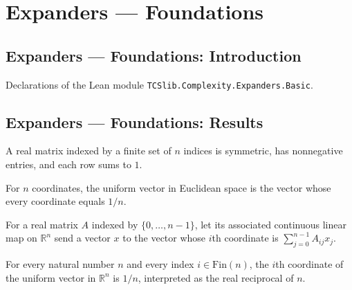 \section{Expanders --- Foundations}
\subsection*{Expanders --- Foundations: Introduction}

Declarations of the Lean module \texttt{TCSlib.Complexity.Expanders.Basic}.

\subsection*{Expanders --- Foundations: Results}

\begin{definition}
\label{Expander.IsSymmStochastic}
\leanok
A real matrix indexed by a finite set of $n$ indices is symmetric, has nonnegative
entries, and each row sums to $1$.
\end{definition}

\begin{definition}
\label{Expander.uniform}
\leanok
For $n$ coordinates, the uniform vector in Euclidean space is the vector whose every
coordinate equals $1/n$.
\end{definition}

\begin{definition}
\label{Expander.toCLM}
\leanok
For a real matrix $A$ indexed by $\{0,\ldots,n-1\}$, let its associated continuous
linear map on $\mathbb R^n$ send a vector $x$ to the vector whose $i$th coordinate is
$\sum_{j=0}^{n-1} A_{ij}x_j$.
\end{definition}

\begin{theorem}
\label{Expander.uniform_apply}
\leanok
{}
For every natural number $n$ and every index $i\in\text{Fin}(n)$, the $i$th coordinate
of the uniform vector in $\mathbb{R}^n$ is $1/n$, interpreted as the real reciprocal of
$n$.
\end{theorem}

